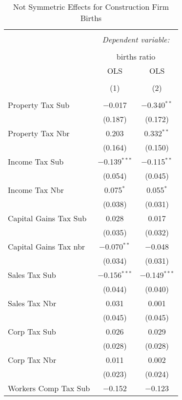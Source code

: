 
\begin{table}[!htbp] \centering 
  \caption{Not Symmetric Effects for  Construction Firm Births} 
  \label{23noequality} 
\footnotesize 
\begin{tabular}{@{\extracolsep{5pt}}lcc} 
\\[-1.8ex]\hline 
\hline \\[-1.8ex] 
 & \multicolumn{2}{c}{\textit{Dependent variable:}} \\ 
\cline{2-3} 
\\[-1.8ex] & \multicolumn{2}{c}{births ratio} \\ 
 & OLS & OLS \\ 
\\[-1.8ex] & (1) & (2)\\ 
\hline \\[-1.8ex] 
 Property Tax Sub & $-$0.017 & $-$0.340$^{**}$ \\ 
  & (0.187) & (0.172) \\ 
  Property Tax Nbr & 0.203 & 0.332$^{**}$ \\ 
  & (0.164) & (0.150) \\ 
  Income Tax Sub & $-$0.139$^{***}$ & $-$0.115$^{**}$ \\ 
  & (0.054) & (0.045) \\ 
  Income Tax Nbr & 0.075$^{*}$ & 0.055$^{*}$ \\ 
  & (0.038) & (0.031) \\ 
  Capital Gains Tax Sub & 0.028 & 0.017 \\ 
  & (0.035) & (0.032) \\ 
  Capital Gains Tax nbr & $-$0.070$^{**}$ & $-$0.048 \\ 
  & (0.034) & (0.031) \\ 
  Sales Tax Sub & $-$0.156$^{***}$ & $-$0.149$^{***}$ \\ 
  & (0.044) & (0.040) \\ 
  Sales Tax Nbr & 0.031 & 0.001 \\ 
  & (0.045) & (0.045) \\ 
  Corp Tax Sub & 0.026 & 0.029 \\ 
  & (0.028) & (0.028) \\ 
  Corp Tax Nbr & 0.011 & 0.002 \\ 
  & (0.023) & (0.024) \\ 
  Workers Comp Tax Sub & $-$0.152 & $-$0.123 \\ 

\end{tabular}
\end{table}
